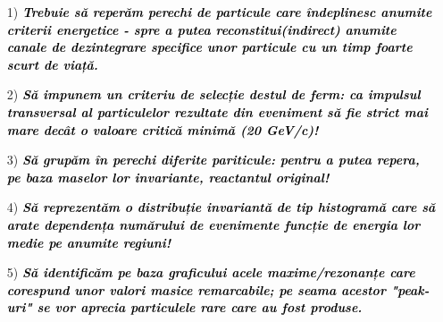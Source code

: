 \documentclass{beamer}
\begin{document}

\begin{frame}{}

\vspace{0cm}
\begin{enumerate}
  \small
  \item[1)] \makebox[0.5cm ]{} \textbf{\textit{ \textcolor{black}{Trebuie să reperăm perechi de particule care îndeplinesc anumite criterii energetice - spre a putea reconstitui(indirect) anumite canale de dezintegrare specifice unor particule cu un timp foarte scurt de viață.}}}\\
 
  \item[2)] \makebox[0.5cm]{} \textit{\textbf{\textcolor{black}{Să impunem un criteriu de selecție destul de ferm: ca impulsul transversal al particulelor rezultate din eveniment să fie strict mai mare decât o valoare critică minimă (20 GeV/c)! }}}\\

  \item[3)] \makebox[0.5cm]{} \textit{\textbf{\textcolor{black}{Să grupăm în perechi diferite pariticule: pentru a putea repera, pe baza maselor lor invariante, reactantul original! }}}\\

  \item[4)] \makebox[0.5cm]{} \textit{\textbf{\textcolor{black}{Să reprezentăm o distribuție invariantă de tip histogramă care să arate dependența numărului de evenimente funcție de energia lor medie pe anumite regiuni! }}}\\

  \item[5)] \makebox[0.5cm]{} \textit{\textbf{\textcolor{black}{Să identificăm pe baza graficului acele maxime/rezonanțe care corespund unor valori masice remarcabile; pe seama acestor "peak-uri" se vor aprecia particulele rare care au fost produse. }}}\\

\end{enumerate}

\end{frame} 
\end{document}
